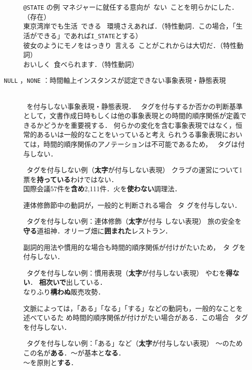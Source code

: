 \documentclass[japanese]{jnlp_1.4}
\def\event{}
\def\makeinstance{}
\def\eventc{}
\begin{document}
\begin{description}
\begin{itembox}[l]{\event\texttt{@STATE} の例}
\small
マネジャーに就任する意向が\event\ ない\eventc\ ことを明らかにした．（存在）\\
東京湾岸でも生活\event\ できる \eventc\ 環境さえあれば．（特性動詞．この場合，「生
活ができる」であれば{\tt I\_STATE}とする）\\
彼女のようにモノをはっきり\event\ 言える\eventc\ ことがこれからは大切だ．（特性動詞）\\
おいしく\event\ 食べられます\eventc．（特性動詞）
\end{itembox}


\item[{\tt NULL} ，{\tt NONE} ：時間軸上インスタンスが認定できない事象表現・静態表現]\mbox{}\\
\makeinstance\ を付与しない事象表現・静態表現．
\makeinstance\ タグを付与するか否かの判断基準として，文書作成日時もしくは他の事象表現との時間的順序関係が定義できるかどうかを重要視する．
何らかの変化を含む事象表現ではなく，恒常的あるいは一般的なことをいっていると考え
られうる事象表現においては，時間的順序関係のアノテーションは不可能であるため，
\makeinstance\ タグは付与しない．

\begin{itembox}[l]{\makeinstance\ タグを付与しない例（{\bf 太字}が付与しない表現）}
\small 
クラブの運営について1票を{\bf 持っている}わけではない．\\
国際会議57件を{\bf 含め}2,111件．火を{\bf 使わない}調理法．
\end{itembox}

連体修飾節中の動詞が，一般的と判断される場合 \makeinstance\ タ
グを付与しない．

\begin{itembox}[l]{\makeinstance\ タグを付与しない例：連体修飾（{\bf 太字}が付与
しない表現）}
\small
旅の安全を{\bf 守る}道祖神．オリーブ畑に{\bf 囲まれた}レストラン．
\end{itembox}

副詞的用法や慣用的な場合も時間的順序関係が付けがたいため，\makeinstance\ タ
グを付与しない．
\begin{itembox}[l]{\makeinstance\ タグを付与しない例：慣用表現（\textbf{太字}が付与しない表現）}
\small
やむを{\bf 得ない}． {\bf 相次いで}出している．\\
なりふり{\bf 構わぬ}販売攻勢．
\end{itembox}

文脈によっては，「ある」「なる」「する」などの動詞も，一般的なことを述べているた
め時間的順序関係が付けがたい場合がある．この場合 \event\ タグを付与しない．

\begin{itembox}[l]{\makeinstance\ タグを付与しない例：「ある」など（{\bf 太字}が付与しない表現）}
\small
〜のためこの名が{\bf ある}．〜が基本と{\bf なる}．\\
〜を原則と{\bf する}．
\end{itembox}

\end{description}
\end{document}
